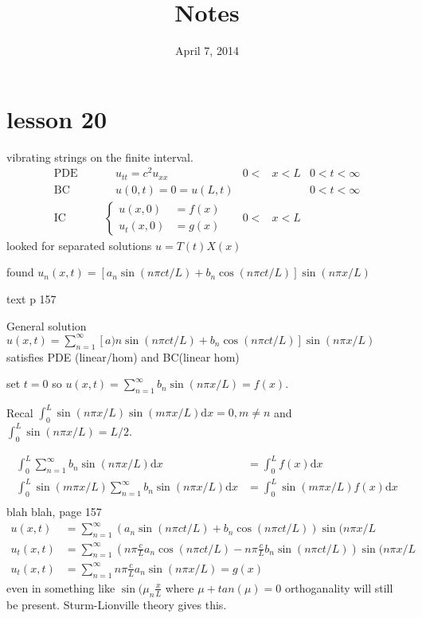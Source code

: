 \documentclass{article}
\begin{document}
\title{Notes}
\date{April 7, 2014}
\maketitle

\section*{lesson 20}
vibrating strings on the finite interval.
\begin{align*}
  \text{PDE}&&&\quad u_{tt}=c^2u_{xx}&0<&x<L&0<t<\infty\\
  \text{BC}&&&\quad u(0,t)=0=u(L,t)&&&0<t<\infty\\
  \text{IC}&&&\begin{cases}u(x,0)&=f(x)\\u_t(x,0)&=g(x)\end{cases}&0<&x<L
\end{align*}
looked for separated solutions $u=T(t)X(x)$

found $u_n(x,t)=[a_n\sin(n\pi ct/L)+b_n\cos(n\pi ct/L)]\sin(n\pi x/L)$

text p 157

General solution $u(x,t)=\sum\limits_{n=1}^\infty{[a)n\sin(n\pi ct/L)+b_n\cos(n\pi ct/L)]\sin(n\pi x/L)}$ satisfies PDE (linear/hom) and BC(linear hom)

set $t=0$ so $u(x,t)=\sum\limits_{n=1}^\infty{b_n\sin(n\pi x/L)}=f(x)$.

Recal $\int_0^L{\sin(n\pi x/L)\sin(m\pi x/L)\mathrm{d}x}=0, m\ne n$ and $\int_0^L{\sin(n\pi x/L)}=L/2$.

\begin{align*}
  \int_0^L{\sum\limits_{n=1}^\infty{b_n\sin(n\pi x/L)}\mathrm{d}x}&=\int_0^L{f(x)\mathrm{d}x}\\
  \int_0^L{\sin(m\pi x/L)\sum\limits_{n=1}^\infty{b_n\sin(n\pi x/L)}\mathrm{d}x}&=\int_0^L{\sin(m\pi x/L)f(x)\mathrm{d}x}\\
\end{align*}
blah blah, page 157
\begin{align*}
  u(x,t)&=\sum\limits_{n=1}^\infty{(a_n\sin(n\pi ct/L)+b_n\cos(n\pi ct/L))\sin(n\pi x/L}\\
  u_t(x,t)&=\sum\limits_{n=1}^\infty{(n\pi \frac{c}{L} a_n\cos(n\pi ct/L)-n\pi\frac{c}{L} b_n\sin(n\pi ct/L))\sin(n\pi x/L}\\
  u_t(x,t)&=\sum\limits_{n=1}^\infty{n\pi \frac{c}{L} a_n\sin(n\pi x/L)}=g(x)
\end{align*}
even in something like $\sin(\mu_n \frac{x}{L}$ where $\mu+tan(\mu)=0$ orthoganality will still be present. Sturm-Lionville theory gives this.
\end{document}
